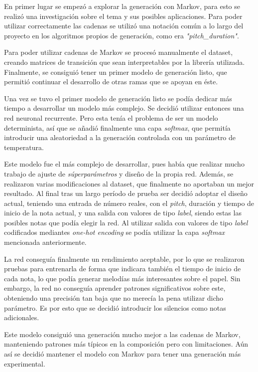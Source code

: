 En primer lugar se empezó a explorar la generación con Markov, para esto se realizó una investigación sobre el tema y sus posibles aplicaciones. Para poder utilizar correctamente las cadenas se utilizó una notación común a lo largo del proyecto en los algoritmos propios de generación, como era \textit{"pitch\_duration"}.

Para poder utilizar cadenas de Markov se procesó manualmente el dataset, creando matrices de transición que sean interpretables por la librería utilizada. Finalmente, se consiguió tener un primer modelo de generación listo, que permitió continuar el desarrollo de otras ramas que se apoyan en éste.

Una vez se tuvo el primer modelo de generación listo se podía dedicar más tiempo a desarrollar un modelo más complejo. Se decidió utilizar entonces una red neuronal recurrente. Pero esta tenía el problema de ser un modelo determinista, así que se añadió finalmente una capa \textit{softmax}, que permitía introducir una aleatoriedad a la generación controlada con un parámetro de temperatura.

Este modelo fue el más complejo de desarrollar, pues había que realizar mucho trabajo de ajuste de \textit{súperparámetros} y diseño de la propia red. Además, se realizaron varias modificaciones al dataset, que finalmente no aportaban un mejor resultado. Al final tras un largo período de prueba ser decidió adoptar el diseño actual, teniendo una entrada de número reales, con el \textit{pitch}, duración y tiempo de inicio de la nota actual, y una salida con valores de tipo \textit{label}, siendo estas las posibles notas que podía elegir la red. Al utilizar salida con valores de tipo \textit{label} codificados mediantes \textit{one-hot encoding} se podía utilizar la capa \textit{softmax} mencionada anteriormente.

La red conseguía finalmente un rendimiento aceptable, por lo que se realizaron pruebas para entrenarla de forma que indicara también el tiempo de inicio de cada nota, lo que podía generar melodías más interesantes sobre el papel. Sin embargo, la red no conseguía aprender patrones significativos sobre este, obteniendo una precisión tan baja que no merecía la pena utilizar dicho parámetro. Es por esto que se decidió introducir los silencios como notas adicionales. 

Este modelo consiguió una generación mucho mejor a las cadenas de Markov, manteniendo patrones más típicos en la composición pero con limitaciones. Aún así se decidió mantener el modelo con Markov para tener una generación más experimental.

